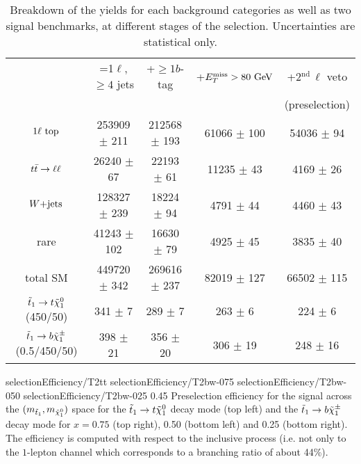         \begin{table}[h!]
            \hspace*{-0.3cm}
            \begin{tabular}{|c|cccc|}
                \hline
                                             & =1$\ell$, $\geq 4$ jets   & +$\geq 1b$-tag     & +$E_T^\text{miss} > 80 ~\text{GeV}$ &  +2$^\text{nd}\, \ell$ veto \\
                                             &                           &                    &                   & (preselection) \\
                \hline
                $1\ell~\text{top}$              & 253909 $\pm$ 211          & 212568 $\pm$ 193   &  61066 $\pm$ 100  & 54036 $\pm$ 94     \\
                $t\bar{t} \rightarrow \ell \ell$               &  26240 $\pm$ 67           &  22193 $\pm$ 61    &  11235 $\pm$ 43   &  4169 $\pm$ 26     \\
                $\text{$W$+jets}$                     & 128327 $\pm$ 239          &  18224 $\pm$ 94    &   4791 $\pm$ 44   &  4460 $\pm$ 43     \\
                rare                         &  41243 $\pm$ 102          &  16630 $\pm$ 79    &   4925 $\pm$ 45   &  3835 $\pm$ 40     \\
                \hline
                total SM                     & 449720 $\pm$ 342          & 269616 $\pm$ 237   &  82019 $\pm$ 127  & 66502 $\pm$ 115    \\
                \hline
$\tilde{t}_1 \rightarrow t \tilde{\chi}_1^0$   (450/50) & 341 $\pm$ 7               & 289 $\pm$ 7        & 263 $\pm$ 6       & 224 $\pm$ 6        \\
$\tilde{t}_1 \rightarrow b \tilde{\chi}_1^\pm$ (0.5/450/50) & 398 $\pm$ 21              & 356 $\pm$ 20       & 306 $\pm$ 19      & 248 $\pm$ 16       \\
                \hline
            \end{tabular}
            \caption{Breakdown of the yields for each background categories as well as two signal benchmarks,
            at different stages of the selection. Uncertainties are statistical only.}
            \label{tab:cutflowPreselection}
        \end{table}

                          {selectionEfficiency/T2tt}
                          {selectionEfficiency/T2bw-075}
                          {selectionEfficiency/T2bw-050}
                          {selectionEfficiency/T2bw-025}
                          {0.45}
                          {Preselection efficiency for the signal across the $(m_{\tilde{t}_1},
                          m_{\tilde{\chi}_1^0})$ space for the $\tilde{t}_1 \rightarrow t \tilde{\chi}_1^0$
                          decay mode (top left) and the $\tilde{t}_1 \rightarrow b \tilde{\chi}_1^\pm$
                          decay mode for $x = 0.75$ (top right), 0.50 (bottom left) and 0.25
                          (bottom right). The efficiency is computed with respect to the
                          inclusive process (i.e. not only to the $1$-lepton channel which
                          corresponds to a branching ratio of about 44\%).}

